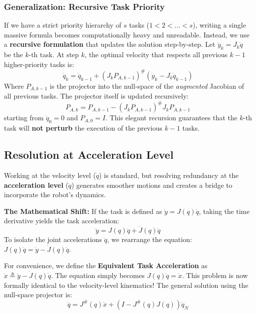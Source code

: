 \documentclass[11pt,a4paper]{article}
\begin{document}
\subsubsection{Generalization: Recursive Task Priority}
If we have a strict priority hierarchy of $s$ tasks ($1 < 2 < \dots < s$), writing a single massive formula becomes computationally heavy and unreadable. Instead, we use a \textbf{recursive formulation} that updates the solution step-by-step.
Let $\dot{y}_k = J_k \dot{q}$ be the $k$-th task. At step $k$, the optimal velocity that respects all previous $k-1$ higher-priority tasks is:
\begin{equation}
    \dot{q}_k = \dot{q}_{k-1} + (J_k P_{A,k-1})^\# (\dot{y}_k - J_k \dot{q}_{k-1})
\end{equation}
Where $P_{A,k-1}$ is the projector into the null-space of the \textit{augmented} Jacobian of all previous tasks. The projector itself is updated recursively:
\begin{equation}
    P_{A,k} = P_{A,k-1} - (J_k P_{A,k-1})^\# J_k P_{A,k-1}
\end{equation}
starting from $\dot{q}_0 = 0$ and $P_{A,0} = I$. This elegant recursion guarantees that the $k$-th task will \textbf{not perturb} the execution of the previous $k-1$ tasks.

\subsection{Resolution at Acceleration Level}
Working at the velocity level ($\dot{q}$) is standard, but resolving redundancy at the \textbf{acceleration level} ($\ddot{q}$) generates smoother motions and creates a bridge to incorporate the robot's dynamics.

\textbf{The Mathematical Shift:} If the task is defined as $\dot{y} = J(q)\dot{q}$, taking the time derivative yields the task acceleration:
\begin{equation}
    \ddot{y} = J(q)\ddot{q} + \dot{J}(q)\dot{q}
\end{equation}
To isolate the joint accelerations $\ddot{q}$, we rearrange the equation: $J(q)\ddot{q} = \ddot{y} - \dot{J}(q)\dot{q}$. 

For convenience, we define the \textbf{Equivalent Task Acceleration} as $\ddot{x} \triangleq \ddot{y} - \dot{J}(q)\dot{q}$. 
The equation simply becomes $J(q)\ddot{q} = \ddot{x}$. This problem is now formally identical to the velocity-level kinematics! The general solution using the null-space projector is:
\begin{equation}
    \ddot{q} = J^\#(q)\ddot{x} + (I - J^\#(q)J(q))\ddot{q}_N
\end{equation}
\end{document}
